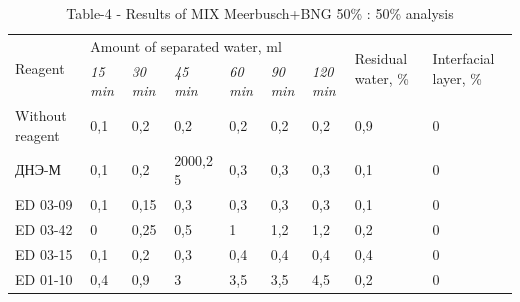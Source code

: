 \begin{table}[H]
\caption*{Table-4 - Results of MIX Meerbusch+BNG 50\% : 50\% analysis}
\centering
\begin{tabular}{|l|llllll|p{}|p{}|}
\hline
\multirow{2}{*}{Reagent} & \multicolumn{6}{l|}{Amount of separated water, ml} & \multirow{2}{=}{Residual water, \%} & \multirow{2}{=}{Interfacial layer, \%} \\ \cline{2-7}
 & \multicolumn{1}{l|}{\textit{15 min}} & \multicolumn{1}{l|}{\textit{30 min}} & \multicolumn{1}{l|}{\textit{45 min}} & \multicolumn{1}{l|}{\textit{60 min}} & \multicolumn{1}{l|}{\textit{90 min}} & \textit{120 min} &  &  \\ \hline
Without reagent & \multicolumn{1}{l|}{0,1} & \multicolumn{1}{l|}{0,2} & \multicolumn{1}{l|}{0,2} & \multicolumn{1}{l|}{0,2} & \multicolumn{1}{l|}{0,2} & 0,2 & 0,9 & 0 \\ \hline
ДНЭ-М & \multicolumn{1}{l|}{0,1} & \multicolumn{1}{l|}{0,2} & \multicolumn{1}{l|}{2000,2 5} & \multicolumn{1}{l|}{0,3} & \multicolumn{1}{l|}{0,3} & 0,3 & 0,1 & 0 \\ \hline
ED 03-09 & \multicolumn{1}{l|}{0,1} & \multicolumn{1}{l|}{0,15} & \multicolumn{1}{l|}{0,3} & \multicolumn{1}{l|}{0,3} & \multicolumn{1}{l|}{0,3} & 0,3 & 0,1 & 0 \\ \hline
ED 03-42 & \multicolumn{1}{l|}{0} & \multicolumn{1}{l|}{0,25} & \multicolumn{1}{l|}{0,5} & \multicolumn{1}{l|}{1} & \multicolumn{1}{l|}{1,2} & 1,2 & 0,2 & 0 \\ \hline
ED 03-15 & \multicolumn{1}{l|}{0,1} & \multicolumn{1}{l|}{0,2} & \multicolumn{1}{l|}{0,3} & \multicolumn{1}{l|}{0,4} & \multicolumn{1}{l|}{0,4} & 0,4 & 0,4 & 0 \\ \hline
ED 01-10 & \multicolumn{1}{l|}{0,4} & \multicolumn{1}{l|}{0,9} & \multicolumn{1}{l|}{3} & \multicolumn{1}{l|}{3,5} & \multicolumn{1}{l|}{3,5} & 4,5 & 0,2 & 0 \\ \hline
\end{tabular}
\end{table}

